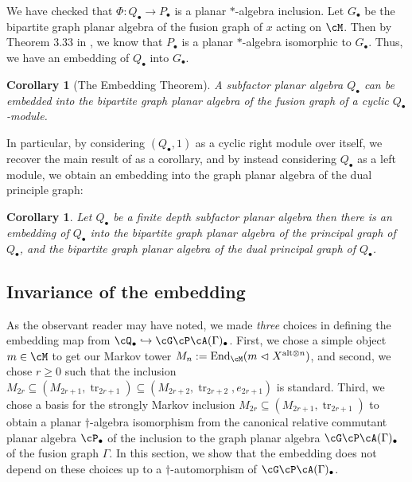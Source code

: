 \documentclass[11pt]{article}
\theoremstyle{plain}
\newtheorem{cor}[thm]{Corollary}
\theoremstyle{definition}
\DeclareMathOperator{\End}{End}
\DeclareMathOperator{\tr}{tr}
\begin{document}
We have checked that $\Phi:Q_{\bullet}\to P_{\bullet}$ is a planar $\ast$-algebra inclusion. Let $G_\bullet$ be the bipartite graph planar algebra of the fusion graph of $x$ acting on $\cM$. Then by Theorem 3.33 in \cite{MR2812459}, 
we know that $P_\bullet$ is a planar $\ast$-algebra isomorphic to $G_\bullet$. Thus, we have an embedding of $Q_\bullet$ into $G_\bullet$.

\begin{cor}[The Embedding Theorem]
 \label{cor:EmbeddingTheorem} %
 A subfactor planar algebra $Q_\bullet$ can be embedded into the bipartite graph planar algebra of the fusion graph of a cyclic $Q_\bullet$-module.
\end{cor}

In particular, by considering $(Q_\bullet,1)$ as a cyclic right module over itself, we recover the main result of \cite{MR2812459} as a corollary, and by instead considering $Q_\bullet$ as a left module, we obtain an embedding into the graph planar algebra of the dual principle graph: 

\begin{cor}
Let $Q_{\bullet}$ be a finite depth subfactor planar algebra then there is an embedding of $Q_{\bullet}$ into the bipartite graph planar algebra of the principal graph of $Q_{\bullet}$, and the bipartite graph planar algebra of the dual principal graph of $Q_{\bullet}$.
\end{cor}

\subsection{Invariance of the embedding}
\label{sec:InvarianceOfEmbedding}

As the observant reader may have noted, we made \emph{three} choices in defining the embedding map from $\cQ_\bullet \hookrightarrow\cG\cP\cA(\Gamma)_\bullet$.
First, we chose a simple object $m\in \cM$ to get our Markov tower $M_n := \End_\cM(m \vartriangleleft X^{\text{alt}\otimes n})$, and second, we chose $r\geq 0$ such that the inclusion $M_{2r}\subseteq (M_{2r+1}, \tr_{2r+1})\subseteq (M_{2r+2}, \tr_{2r+2}, e_{2r+1})$ is standard.
Third, we chose a basis for the strongly Markov inclusion $M_{2r}\subseteq (M_{2r+1}, \tr_{2r+1})$ to obtain a planar $\dag$-algebra isomorphism from the canonical relative commutant planar algebra $\cP_\bullet$ of the inclusion to the graph planar algebra $\cG\cP\cA(\Gamma)_\bullet$ of the fusion graph $\Gamma$.
In this section, we show that the embedding does not depend on these choices up to a $\dag$-automorphism of $\cG\cP\cA(\Gamma)_\bullet$.
\end{document}
